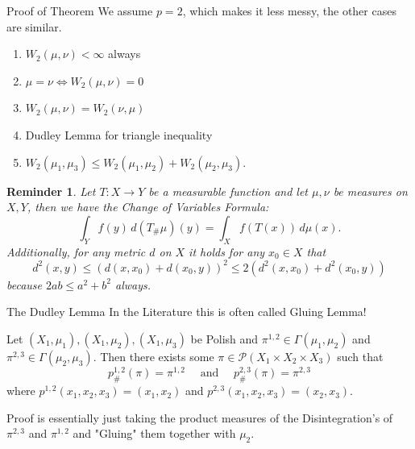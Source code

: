 \documentclass[10pt]{beamer}
\theoremstyle{reminder}
\newtheorem{reminder}{Reminder}
\begin{document}
\begin{frame}{Proof of Theorem}
    We assume $p = 2$, which makes it less messy, the other cases are similar.
    \bigbreak
    \begin{enumerate}
        \item $W_2(\mu, \nu) < \infty$ always
        \item $\mu = \nu \Leftrightarrow W_2(\mu,\nu) = 0$
        \item $W_2(\mu,\nu) = W_2(\nu, \mu)$
        \item Dudley Lemma for triangle inequality
        \item $W_2(\mu_1,\mu_3) \leq W_2(\mu_1,\mu_2) + W_2(\mu_2,\mu_3).$
    \end{enumerate}
    \begin{reminder}
        Let \( T: X \to Y \) be a measurable function and let $\mu,\nu$ be measures on $X,Y$, then we have the Change of Variables Formula:
        $$\int_Y f(y) \, d(T_{\#}\mu)(y) = \int_X f(T(x)) \, d\mu(x).$$
        Additionally, for any metric $d$ on $X$ it holds for any $x_0 \in X$ that $$d^2(x,y) \leq (d(x,x_0)+d(x_0,y))^2 \leq 2(d^2(x,x_0)+d^2(x_0,y))$$ because $2ab \leq a^2+b^2$ always.
    \end{reminder}
\end{frame}

\begin{frame}{The Dudley Lemma}
    In the Literature this is often called Gluing Lemma!

    \begin{lemma}
        Let $(X_1,\mu_1), (X_1,\mu_2),(X_1,\mu_3)$ be Polish and $\pi^{1,2} \in \Gamma(\mu_1,\mu_2)$ and $\pi^{2,3} \in \Gamma(\mu_2,\mu_3)$. 
        Then there exists some $\pi \in \mathcal{P}(X_1 \times X_2 \times X_3)$ such that $$p_{\#}^{1,2}(\pi) = \pi^{1,2} \quad \text{ and } \quad p_{\#}^{2,3}(\pi) = \pi^{2,3}$$ where $p^{1,2}(x_1,x_2,x_3) = (x_1,x_2)$ and $p^{2,3}(x_1,x_2,x_3) = (x_2,x_3).$ 
    \end{lemma}

    Proof is essentially just taking the product measures of the Disintegration's of $\pi^{2,3}$ and $\pi^{1,2}$ and "Gluing" them together with $\mu_2$. 
\end{frame}
\end{document}
